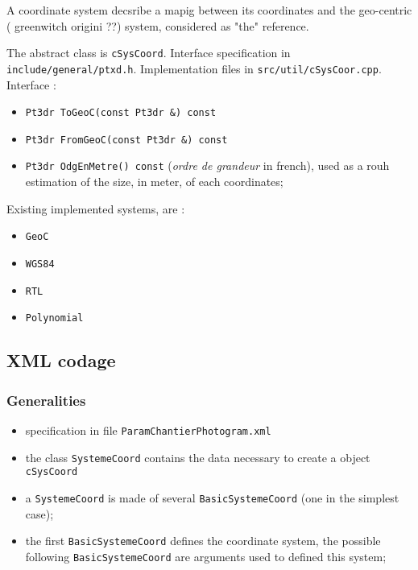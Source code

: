 A coordinate system decsribe a mapig between its coordinates 
and the geo-centric ( greenwitch origini ??) system, considered
as "the" reference.

The abstract \CPP  class is {\tt cSysCoord}.
Interface specification in {\tt include/general/ptxd.h}.
Implementation files in {\tt src/util/cSysCoor.cpp}.
Interface :

\begin{itemize}
    \item {\tt Pt3dr ToGeoC(const Pt3dr \&) const}
    \item {\tt Pt3dr FromGeoC(const Pt3dr \&) const}
    \item {\tt Pt3dr OdgEnMetre() const} (\emph{ordre de grandeur} in french),
         used as a rouh estimation of the size, in meter, of each coordinates;
\end{itemize}

Existing implemented systems, are  :

\begin{itemize}
   \item  {\tt GeoC}
   \item  {\tt WGS84}
   \item  {\tt RTL}
   \item  {\tt Polynomial}
\end{itemize}



\subsection{XML codage}



\subsubsection{Generalities}

\begin{itemize}
   \item specification in file {\tt ParamChantierPhotogram.xml}
   \item the class {\tt SystemeCoord} contains the data necessary to create a \CPP object {\tt cSysCoord}
   \item  a {\tt SystemeCoord} is made of several {\tt BasicSystemeCoord} (one in the simplest case);
   
   \item the first  {\tt BasicSystemeCoord} defines the coordinate system, the possible following
          {\tt BasicSystemeCoord} are arguments used to defined this system;
\end{itemize}


